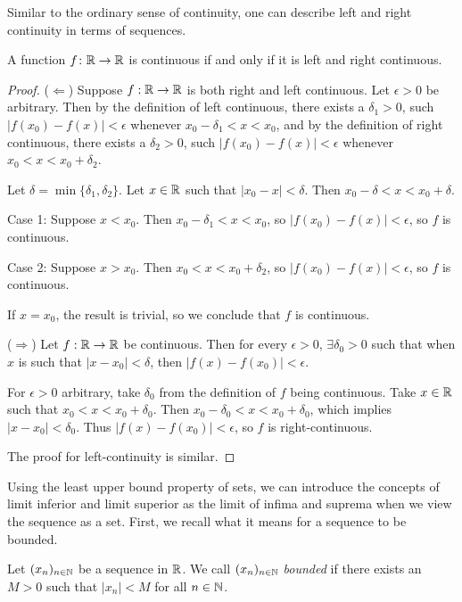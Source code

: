 \documentclass{article}
\begin{document}
Similar to the ordinary sense of continuity, one can describe left and right continuity in terms of sequences. 

\begin{proposition}
 A function $f\colon {\mathbb{R}} \to {\mathbb{R}}$ is continuous if and only if it is left and right continuous. 
\end{proposition}

\begin{proof}
($\Leftarrow$) Suppose $f:{\mathbb{R}} \to {\mathbb{R}}$ is both right and left continuous. Let $\epsilon > 0$ be arbitrary. Then by the definition of left continuous, there exists a $\delta_1>0$, such $\vert f(x_0)-f(x)\vert<\epsilon$ whenever $ x_0-\delta_1 <x<x_0$, and by the definition of right continuous, there exists a $\delta_2>0$, such $\vert f(x_0)-f(x)\vert<\epsilon$ whenever $x_0<x<x_0+\delta_2$.

Let $\delta = \min\{\delta_1,\delta_2\}$. Let $x \in {\mathbb{R}}$ such that $\vert x_0-x\vert <\delta$. Then $x_0- \delta < x < x_0 + \delta$. 

Case 1: Suppose $x < x_0$. Then $x_0- \delta_1 < x <x_0$, so $\vert f(x_0)-f(x)\vert<\epsilon$, so $f$ is continuous.

Case 2: Suppose $x > x_0$. Then $x_0 < x < x_0 + \delta_2$, so $\vert f(x_0)-f(x)\vert<\epsilon$, so $f$ is continuous.

If $x=x_0$, the result is trivial, so we conclude that $f$ is continuous.

($\Rightarrow$) Let $f:{\mathbb{R}} \to {\mathbb{R}}$ be continuous. Then for every $\epsilon >0$, $\exists \delta_0 > 0$ such that when $x$ is such that $|x - x_0| < \delta$, then $|f(x) - f(x_0)| < \epsilon$.

For $\epsilon > 0$ arbitrary, take $\delta_0$ from the definition of $f$ being continuous.  Take $x \in {\mathbb{R}}$ such that $x_0 < x < x_0 + \delta_0 $. Then $x_0 - \delta_0 < x < x_0 + \delta_0 $, which implies $|x - x_0| < \delta_0 $. Thus  $|f(x) - f(x_0)| < \epsilon$, so $f$ is right-continuous.

The proof for left-continuity is similar. 
\end{proof}

Using the least upper bound property of sets, we can introduce the concepts of limit inferior and limit superior as the limit of infima and suprema when we view the sequence as a set. First, we recall what it means for a sequence to be bounded.

\begin{definition}
Let $(x_n)_{n\in {\mathbb{N}}}$ be a sequence in ${\mathbb{R}}$. We call $(x_n)_{n\in {\mathbb{N}}}$ \emph{bounded} if there exists an $M > 0$ such that $\vert x_n\vert<M$ for all $n\in {\mathbb{N}}$.
\end{definition}
\end{document}
